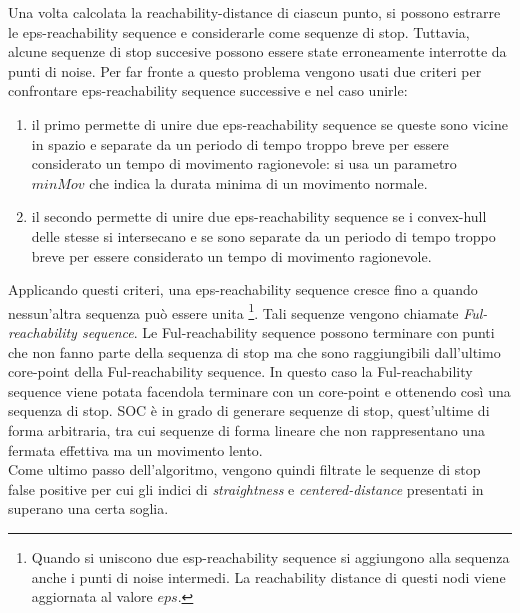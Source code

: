 \documentclass[12pt]{article}
\begin{document}
Una volta calcolata la reachability-distance di ciascun punto, si possono estrarre le eps-reachability sequence e considerarle come sequenze di stop.
Tuttavia, alcune sequenze di stop succesive possono essere state erroneamente interrotte da punti di noise.
Per far fronte a questo problema vengono usati due criteri per confrontare eps-reachability sequence successive e nel caso unirle:
\begin{enumerate}
    \item il primo permette di unire due eps-reachability sequence se queste sono vicine in spazio e separate da un periodo di tempo troppo breve per essere considerato un tempo di movimento ragionevole: si usa un parametro $minMov$ che indica la durata minima di un movimento normale.
    \item il secondo permette di unire due eps-reachability sequence se i convex-hull delle stesse si intersecano e se sono separate da un periodo di tempo troppo breve per essere considerato un tempo di movimento ragionevole.
\end{enumerate}
Applicando questi criteri, una eps-reachability sequence cresce fino a quando nessun'altra sequenza può essere unita \footnote{Quando si uniscono due esp-reachability sequence si aggiungono alla sequenza anche i punti di noise intermedi. La reachability distance di questi nodi viene aggiornata al valore $eps$.}.
Tali sequenze vengono chiamate \emph{Ful-reachability sequence}. Le Ful-reachability sequence possono terminare con punti che non fanno parte della sequenza di stop ma che sono raggiungibili dall'ultimo core-point della Ful-reachability sequence.
In questo caso la Ful-reachability sequence viene potata facendola terminare con un core-point e ottenendo così una sequenza di stop.
SOC è in grado di generare sequenze di stop, quest'ultime di forma arbitraria, tra cui sequenze di forma lineare che non rappresentano una fermata effettiva ma un movimento lento.\\
Come ultimo passo dell'algoritmo, vengono quindi filtrate le sequenze di stop false positive per cui gli indici di \emph{straightness} e \emph{centered-distance} presentati in \cite{SequenceClustering} superano una certa soglia.
\end{document}
